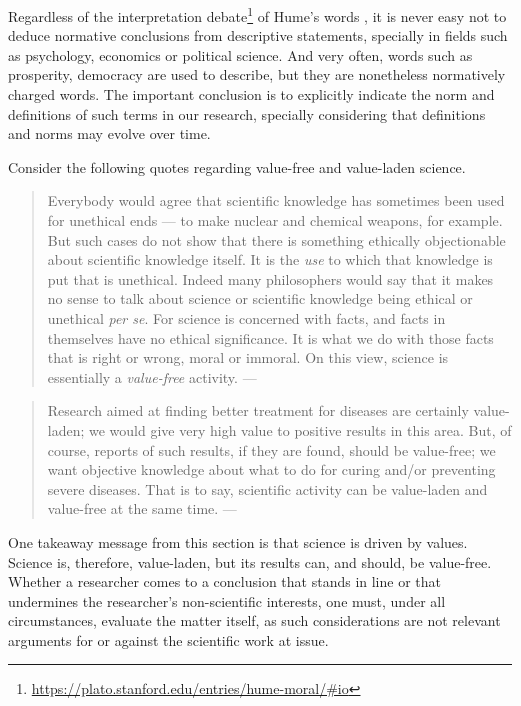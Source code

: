 \documentclass[
  12pt,
]{book}
\DeclareRobustCommand{\href}[2]{#2\footnote{\url{#1}}}
\begin{document}
Regardless of the \href{https://plato.stanford.edu/entries/hume-moral/\#io}{interpretation debate} of Hume's words \citep{sep-hume-moral}, it is never easy not to deduce normative conclusions from descriptive statements, specially in fields such as psychology, economics or political science. And very often, words such as prosperity, democracy are used to describe, but they are nonetheless normatively charged words. The important conclusion is to explicitly indicate the norm and definitions of such terms in our research, specially considering that definitions and norms may evolve over time.

Consider the following quotes regarding value-free and value-laden science.

\begin{quote}
Everybody would agree that scientific knowledge has sometimes been used for unethical ends --- to make nuclear and chemical weapons, for example. But such cases do not show that there is something ethically objectionable about scientific knowledge itself. It is the \emph{use} to which that knowledge is put that is unethical. Indeed many philosophers would say that it makes no sense to talk about science or scientific knowledge being ethical or unethical \emph{per se}. For science is concerned with facts, and facts in themselves have no ethical significance. It is what we do with those facts that is right or wrong, moral or immoral. On this view, science is essentially a \emph{value-free} activity. --- \citep{okasha-pos}
\end{quote}

\begin{quote}
Research aimed at finding better treatment for diseases are certainly value-laden; we would give very high value to positive results in this area. But, of course, reports of such results, if they are found, should be value-free; we want objective knowledge about what to do for curing and/or preventing severe diseases. That is to say, scientific activity can be value-laden and value-free at the same time. --- \citep{johansson2016philosophy}
\end{quote}

One takeaway message from this section is that science is driven by values. Science is, therefore, value-laden, but its results can, and should, be value-free. Whether a researcher comes to a conclusion that stands in line or that undermines the researcher's non-scientific interests, one must, under all circumstances, evaluate the matter itself, as such considerations are not relevant arguments for or against the scientific work at issue.
\end{document}
